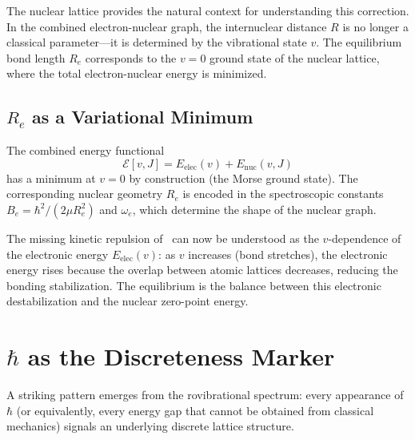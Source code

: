 \documentclass[aps,pra,twocolumn,superscriptaddress,longbibliography]{revtex4-2}
\begin{document}
The nuclear lattice provides the natural context for understanding this
correction.  In the combined electron-nuclear graph, the internuclear
distance $R$ is no longer a classical parameter---it is determined by
the vibrational state $v$.  The equilibrium bond length $R_e$
corresponds to the $v = 0$ ground state of the nuclear lattice, where
the total electron-nuclear energy is minimized.

\subsection{$R_e$ as a Variational Minimum}

The combined energy functional
\begin{equation}
\mathcal{E}[v, J] = E_{\mathrm{elec}}(v) + E_{\mathrm{nuc}}(v, J)
\label{eq:total_energy}
\end{equation}
has a minimum at $v = 0$ by construction (the Morse ground state).  The
corresponding nuclear geometry $R_e$ is encoded in the spectroscopic
constants $B_e = \hbar^2/(2\mu R_e^2)$ and $\omega_e$, which determine
the shape of the nuclear graph.

The missing kinetic repulsion of~\cite{lcao_paper} can now be understood
as the $v$-dependence of the electronic energy $E_{\mathrm{elec}}(v)$:
as $v$ increases (bond stretches), the electronic energy rises because
the overlap between atomic lattices decreases, reducing the bonding
stabilization.  The equilibrium is the balance between this electronic
destabilization and the nuclear zero-point energy.


\section{$\hbar$ as the Discreteness Marker}
\label{sec:hbar}

A striking pattern emerges from the rovibrational spectrum: every
appearance of $\hbar$ (or equivalently, every energy gap that cannot be
obtained from classical mechanics) signals an underlying discrete lattice
structure.
\end{document}
